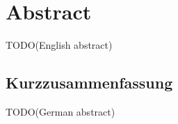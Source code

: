 
\section*{Abstract}

\blindtext

TODO(English abstract)

\begin{otherlanguage}{ngerman}
  \section*{Kurzzusammenfassung}
  
  \blindtext
  
  TODO(German abstract)
\end{otherlanguage}
